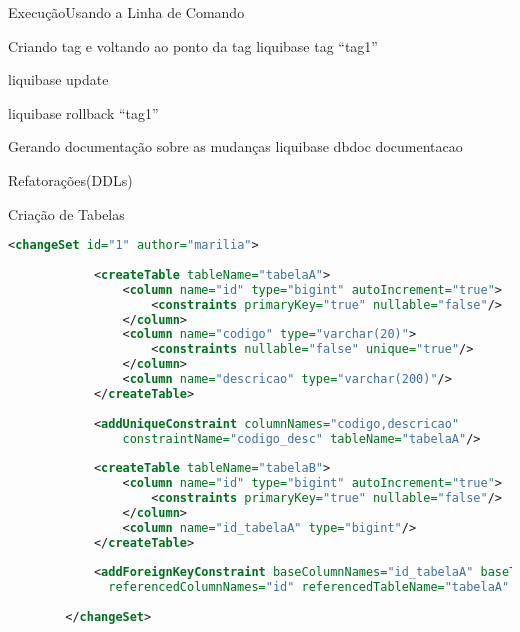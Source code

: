 \begin{frame}[c]{Execução}{Usando a Linha de Comando}

\begin{block}{Criando tag e voltando ao ponto da tag}
    liquibase tag “tag1”
    
    liquibase update
    
    liquibase rollback “tag1”
\end{block}

\begin{block}{Gerando documentação sobre as mudanças}
    liquibase dbdoc documentacao
\end{block}
\begin{center}
\end{center}

\end{frame}

\begin{frame}[fragile]{Refatorações(DDLs)}
\begin{block}{Criação de Tabelas}
    \begin{lstlisting}[language=XML]               
        <changeSet id="1" author="marilia">
        
            <createTable tableName="tabelaA">
                <column name="id" type="bigint" autoIncrement="true">
                    <constraints primaryKey="true" nullable="false"/>
                </column>
                <column name="codigo" type="varchar(20)">
                    <constraints nullable="false" unique="true"/>
                </column>
                <column name="descricao" type="varchar(200)"/>
            </createTable>
            
            <addUniqueConstraint columnNames="codigo,descricao"
                constraintName="codigo_desc" tableName="tabelaA"/>
            
            <createTable tableName="tabelaB">
                <column name="id" type="bigint" autoIncrement="true">
                    <constraints primaryKey="true" nullable="false"/>
                </column>
                <column name="id_tabelaA" type="bigint"/>
            </createTable>
            
            <addForeignKeyConstraint baseColumnNames="id_tabelaA" baseTableName="tabelaB" 
              referencedColumnNames="id" referencedTableName="tabelaA" constraintName="id_tabelaA_fk"/>
              
        </changeSet>
    \end{lstlisting}
\end{block}
\end{frame}

